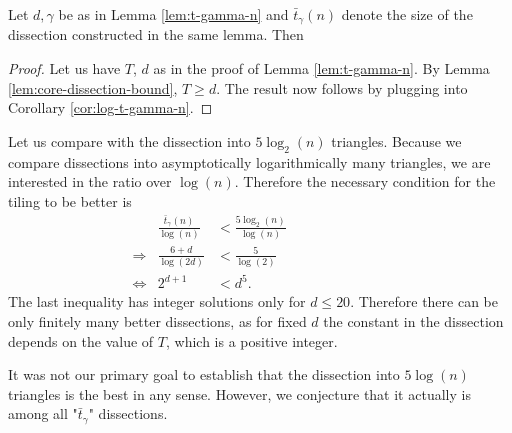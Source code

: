 \begin{lem} Let $d,\gamma$ be as in Lemma \ref{lem:t-gamma-n} and $\bar t_\gamma(n)$ denote the size of the dissection constructed in the same lemma. Then
\end{lem}%
\begin{proof}
Let us have $T$, $d$ as in the proof of Lemma \ref{lem:t-gamma-n}. By Lemma \ref{lem:core-dissection-bound}, $T \geq d$. The result now follows by plugging into Corollary \ref{cor:log-t-gamma-n}.
\end{proof}

Let us compare with the dissection into $5 \log_2(n)$ triangles. Because we compare dissections into asymptotically logarithmically many triangles, we are interested in the ratio over $\log(n)$. Therefore the necessary condition for the tiling to be better is
\begin{align}
	& &\frac{\bar t_\gamma(n)}{\log (n)} &< \frac{5 \log_2(n)}{\log(n)} \hspace{8em} \\
	&\Rightarrow & \frac{6+d}{\log(2d)} &< \frac{5}{\log(2)} \\
	&\Leftrightarrow &  2 ^ {d+1} &< d^5.
\end{align}
The last inequality has integer solutions only for $d \leq 20$. Therefore there can be only finitely many better dissections, as for fixed $d$ the constant in the dissection depends on the value of $T$, which is a positive integer.

It was not our primary goal to establish that the dissection into $5 \log(n)$ triangles is the best in any sense. However, we conjecture that it actually is among all "$\bar t_\gamma$" dissections.




